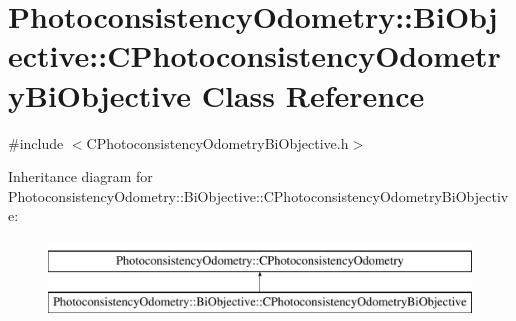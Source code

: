 \hypertarget{class_photoconsistency_odometry_1_1_bi_objective_1_1_c_photoconsistency_odometry_bi_objective}{
\section{PhotoconsistencyOdometry::BiObjective::CPhotoconsistencyOdometryBiObjective Class Reference}
\label{class_photoconsistency_odometry_1_1_bi_objective_1_1_c_photoconsistency_odometry_bi_objective}
}


{\ttfamily \#include $<$CPhotoconsistencyOdometryBiObjective.h$>$}

Inheritance diagram for PhotoconsistencyOdometry::BiObjective::CPhotoconsistencyOdometryBiObjective:\begin{figure}[H]
\begin{center}
\leavevmode
\includegraphics[height=2.000000cm]{class_photoconsistency_odometry_1_1_bi_objective_1_1_c_photoconsistency_odometry_bi_objective}
\end{center}
\end{figure}
